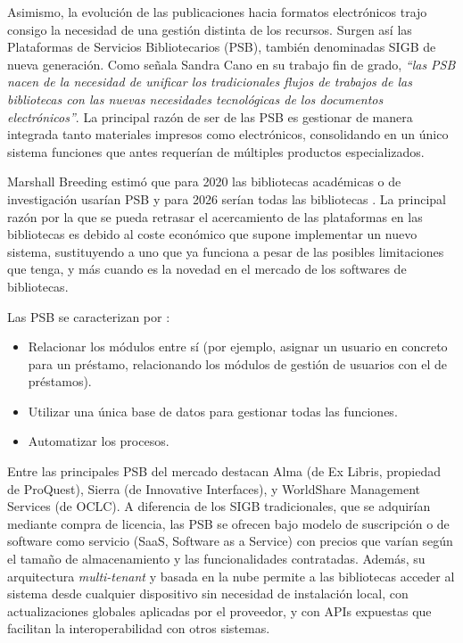 Asimismo, la evolución de las publicaciones hacia formatos electrónicos trajo consigo la necesidad de una gestión distinta de los recursos. Surgen así las Plataformas de Servicios Bibliotecarios (PSB), también denominadas SIGB de nueva generación. Como señala Sandra Cano \parencite{cano2021psb} en su trabajo fin de grado, \textit{``las PSB nacen de la necesidad de unificar los tradicionales flujos de trabajos de las bibliotecas con las nuevas necesidades tecnológicas de los documentos electrónicos''}. La principal razón de ser de las PSB es gestionar de manera integrada tanto materiales impresos como electrónicos, consolidando en un único sistema funciones que antes requerían de múltiples productos especializados.

Marshall Breeding estimó que para 2020 las bibliotecas académicas o de investigación usarían PSB y para 2026 serían todas las bibliotecas \parencite{breeding_history}. La principal razón por la que se pueda retrasar el acercamiento de las plataformas en las bibliotecas es debido al coste económico que supone implementar un nuevo sistema, sustituyendo a uno que ya funciona a pesar de las posibles limitaciones que tenga, y más cuando es la novedad en el mercado de los softwares de bibliotecas.

Las PSB se caracterizan por \parencite{cano2021psb}:
\begin{itemize}
	\item Relacionar los módulos entre sí (por ejemplo, asignar un usuario en concreto para un préstamo, relacionando los módulos de gestión de usuarios con el de préstamos).
	\item Utilizar una única base de datos para gestionar todas las funciones.
	\item Automatizar los procesos.
\end{itemize}

Entre las principales PSB del mercado destacan Alma (de Ex Libris, propiedad de ProQuest), Sierra (de Innovative Interfaces), y WorldShare Management Services (de OCLC). A diferencia de los SIGB tradicionales, que se adquirían mediante compra de licencia, las PSB se ofrecen bajo modelo de suscripción o de software como servicio (SaaS, Software as a Service) con precios que varían según el tamaño de almacenamiento y las funcionalidades contratadas. Además, su arquitectura \textit{multi-tenant} y basada en la nube permite a las bibliotecas acceder al sistema desde cualquier dispositivo sin necesidad de instalación local, con actualizaciones globales aplicadas por el proveedor, y con APIs expuestas que facilitan la interoperabilidad con otros sistemas.

